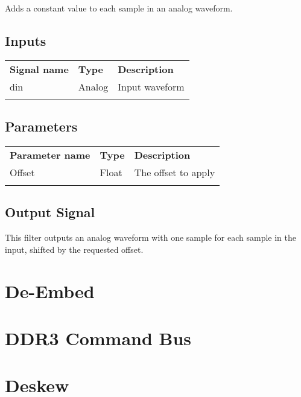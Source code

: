 Adds a constant value to each sample in an analog waveform.

\subsection{Inputs}

\begin{tabularx}{16cm}{llX}
\thickhline
\textbf{Signal name} & \textbf{Type} & \textbf{Description} \\
\thickhline
din & Analog & Input waveform \\
\thickhline
\end{tabularx}

\subsection{Parameters}

\begin{tabularx}{16cm}{llX}
\thickhline
\textbf{Parameter name} & \textbf{Type} & \textbf{Description} \\
\thickhline
Offset & Float & The offset to apply \\
\thickhline
\end{tabularx}

\subsection{Output Signal}

This filter outputs an analog waveform with one sample for each sample in the input, shifted by the requested offset.

\pagebreak
\section{De-Embed}

\pagebreak
\section{DDR3 Command Bus}

\pagebreak
\section{Deskew}

